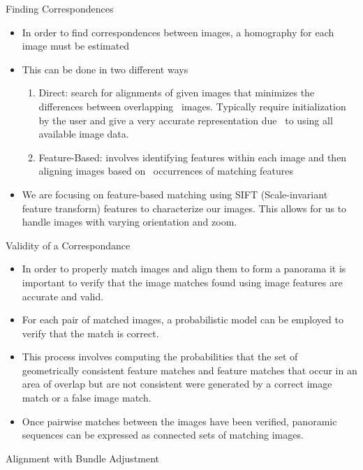 \documentclass{beamer}
\begin{document}
\begin{frame}{Finding Correspondences}
        \begin{itemize}
            \item In order to find correspondences between images, a homography for each image must be estimated
            \item This can be done in two different ways
            	\begin{enumerate}
			\item Direct: search for alignments of given images that minimizes the differences between overlapping \
					 images. Typically require initialization by the user and give a very accurate representation due \
					 to using all available image data.
			\item Feature-Based: involves identifying features within each image and then aligning images based on \
					 occurrences of matching features
		\end{enumerate}
	   \item We are focusing on feature-based matching using SIFT (Scale-invariant feature transform) features to characterize our images. This allows for us to handle images with varying orientation and zoom.
        \end{itemize}
\end{frame}

\begin{frame}{Validity of a Correspondance}
        \begin{itemize}
            \item In order to properly match images and align them to form a panorama it is important to verify that the image matches found using image features are accurate and valid.
            \item For each pair of matched images, a probabilistic model can be employed to verify that the match is correct.
            \item This process involves computing the probabilities that the set of geometrically consistent feature matches and feature matches that occur in an area of overlap but are not consistent were generated by a correct image match or a false image match.
            \item Once pairwise matches between the images have been verified, panoramic sequences can be expressed as connected sets of matching images.
        \end{itemize}
\end{frame}

\begin{frame}{Alignment with Bundle Adjustment}

\end{frame}
\end{document}
